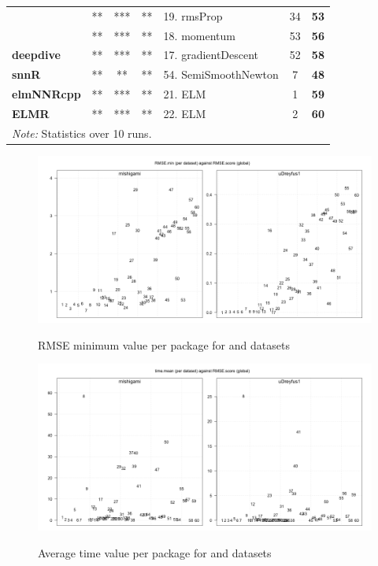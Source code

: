 \begin{Schunk}
\begin{table}
\begin{tabular}[t]{>{}lccclc>{}c}
 & ** & *** & ** & 19. rmsProp & 34 & \textbf{53}\\

 & ** & *** & ** & 18. momentum & 53 & \textbf{56}\\

\multirow{-4}{*}{\raggedright\arraybackslash \textbf{deepdive}} & ** & *** & ** & 17. gradientDescent & 52 & \textbf{58}\\
\cmidrule{1-7}
\textbf{snnR} & ** & ** & ** & 54. SemiSmoothNewton & 7 & \textbf{48}\\
\cmidrule{1-7}
\textbf{elmNNRcpp} & ** & *** & ** & 21. ELM & 1 & \textbf{59}\\
\cmidrule{1-7}
\textbf{ELMR} & ** & *** & ** & 22. ELM & 2 & \textbf{60}\\
\bottomrule
\multicolumn{7}{l}{\rule{0pt}{1em}\textit{Note: } Statistics over 10 runs.}\\
\end{tabular}
\end{table}

\end{Schunk}

\begin{figure}
  \centering
  \includegraphics[width=\textwidth]{mIshigami-uDreyfus1-RMSEmin.png}
        \label{fig:Allpkg:RMSEmin}
        \caption{RMSE minimum value per package for 
        and  datasets}
\end{figure}

\begin{figure}
  \centering
  \includegraphics[width=\textwidth]{mIshigami-uDreyfus1-timmean.png}
        \label{fig:Allpkg:timemean}
        \caption{Average time value per package for 
        and  datasets}
\end{figure}

